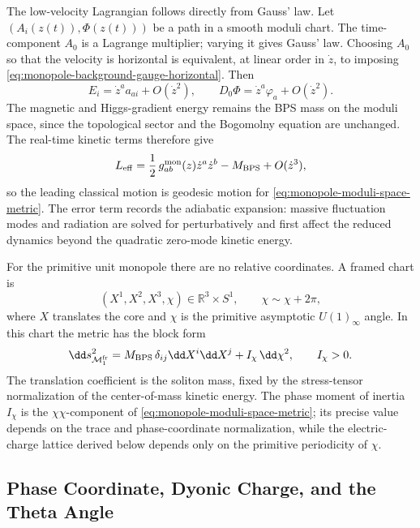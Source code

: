 The low-velocity Lagrangian follows directly from Gauss' law.  Let
\((A_i(z(t)),\Phi(z(t)))\) be a path in a smooth moduli chart.  The
time-component \(A_0\) is a Lagrange multiplier; varying it gives Gauss' law.
Choosing \(A_0\) so that the velocity is horizontal is equivalent, at linear
order in \(\dot z\), to imposing
\eqref{eq:monopole-background-gauge-horizontal}.  Then
\[
  E_i=\dot z^a a_{a i}+O(\dot z^2),
  \qquad
  D_0\Phi=\dot z^a\varphi_a+O(\dot z^2).
\]
The magnetic and Higgs-gradient energy remains the BPS mass on the moduli
space, since the topological sector and the Bogomolny equation are unchanged.
The real-time kinetic terms therefore give
\begin{equation}
  L_{\rm eff}
  =
  \frac12\,g_{ab}^{\rm mon}(z)\dot z^a\dot z^b
  -M_{\rm BPS}
  +O(\dot z^3),
  \label{eq:monopole-low-velocity-lagrangian}
\end{equation}
so the leading classical motion is geodesic motion for
\eqref{eq:monopole-moduli-space-metric}.  The error term records the
adiabatic expansion: massive fluctuation modes and radiation are solved for
perturbatively and first affect the reduced dynamics beyond the quadratic
zero-mode kinetic energy.

For the primitive unit monopole there are no relative coordinates.  A framed
chart is
\[
  (X^1,X^2,X^3,\chi)\in \mathbb R^3\times S^1,
  \qquad
  \chi\sim\chi+2\pi ,
\]
where \(X\) translates the core and \(\chi\) is the primitive asymptotic
\(U(1)_\infty\) angle.  In this chart the metric has the block form
\begin{equation}
  \dd s^2_{\mathcal M_1^{\rm fr}}
  =
  M_{\rm BPS}\,\delta_{ij}\dd X^i\dd X^j
  +
  I_\chi\,\dd\chi^2 ,
  \qquad I_\chi>0.
  \label{eq:unit-monopole-framed-metric-block}
\end{equation}
The translation coefficient is the soliton mass, fixed by the stress-tensor
normalization of the center-of-mass kinetic energy.  The phase moment of
inertia \(I_\chi\) is the \(\chi\chi\)-component of
\eqref{eq:monopole-moduli-space-metric}; its precise value depends on the
trace and phase-coordinate normalization, while the electric-charge lattice
derived below depends only on the primitive periodicity of \(\chi\).

\subsection{Phase Coordinate, Dyonic Charge, and the Theta Angle}
\label{subsec:monopole-phase-coordinate-dyons-witten-effect}

